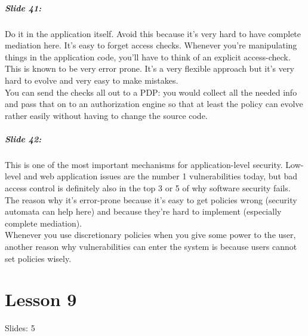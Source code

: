 \documentclass[10pt,a4paper]{report}
\begin{document}
\paragraph{Slide 41:} Do it in the application itself. Avoid this because it's very hard to have complete mediation here. It's easy to forget access checks. Whenever you're manipulating things in the application code, you'll have to think of an explicit access-check. This is known to be very error prone. It's a very flexible approach but it's very hard to evolve and very easy to make mistakes. \\
You can send the checks all out to a PDP: you would collect all the needed info and pass that on to an authorization engine so that at least the policy can evolve rather easily without having to change the source code.

\paragraph{Slide 42:} This is one of the most important mechanisms for application-level security. Low-level and web application issues are the number 1 vulnerabilities today, but bad access control is definitely also in the top 3 or 5 of why software security fails. The reason why it's error-prone because it's easy to get policies wrong (security automata can help here) and because they're hard to implement (especially complete mediation).\\
Whenever you use discretionary policies when you give some power to the user, another reason why vulnerabilities can enter the system is because users cannot set policies wisely.

\chapter{Lesson 9}
Slides: 5
\end{document}

